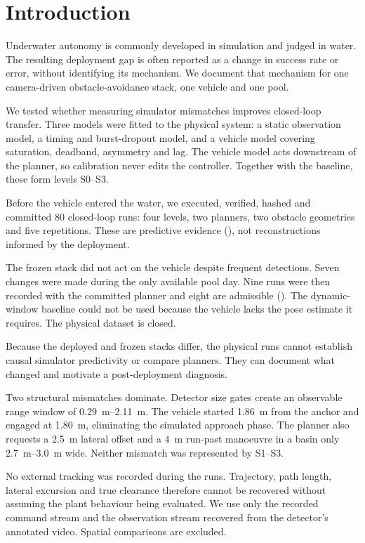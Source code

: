 \section{Introduction}
\label{sec:introduction}

Underwater autonomy is commonly developed in simulation and judged in
water. The resulting deployment gap is often reported as a change in
success rate or error, without identifying its mechanism. We document
that mechanism for one camera-driven obstacle-avoidance stack, one
vehicle and one pool.

We tested whether measuring simulator mismatches improves closed-loop
transfer. Three models were fitted to the physical system: a static
observation model, a timing and burst-dropout model, and a vehicle model
covering saturation, deadband, asymmetry and lag. The vehicle model acts
downstream of the planner, so calibration never edits the controller.
Together with the baseline, these form levels S0--S3.

Before the vehicle entered the water, we executed, verified, hashed and
committed 80 closed-loop runs: four levels, two planners, two obstacle
geometries and five repetitions. These are predictive evidence
(\frozenmark), not reconstructions informed by the deployment.

The frozen stack did not act on the vehicle despite frequent detections.
Seven changes were made during the only available pool day. Nine runs
were then recorded with the committed planner and eight are admissible
(\realmark). The dynamic-window baseline could not be used because the
vehicle lacks the pose estimate it requires. The physical dataset is
closed.

Because the deployed and frozen stacks differ, the physical runs cannot
establish causal simulator predictivity or compare planners. They can
document what changed and motivate a post-deployment diagnosis.

Two structural mismatches dominate. Detector size gates create an
observable range window of \SIrange{0.29}{2.11}{\metre}. The vehicle
started \SI{1.86}{\metre} from the anchor and engaged at
\SI{1.80}{\metre}, eliminating the simulated approach phase. The planner
also requests a \SI{2.5}{\metre} lateral offset and a \SI{4}{\metre}
run-past manoeuvre in a basin only \SIrange{2.7}{3.0}{\metre} wide.
Neither mismatch was represented by S1--S3.

No external tracking was recorded during the runs. Trajectory, path
length, lateral excursion and true clearance therefore cannot be
recovered without assuming the plant behaviour being evaluated. We use
only the recorded command stream and the observation stream recovered
from the detector's annotated video. Spatial comparisons are excluded.

